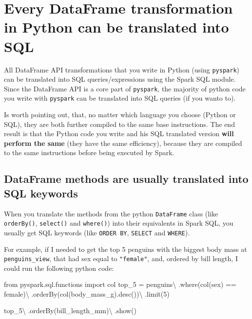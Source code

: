 \documentclass[
  11pt,
  letterpaper,
  DIV=11,
  numbers=noendperiod]{scrreprt}
\newenvironment{Shaded}{\begin{snugshade}}{\end{snugshade}}
\newcommand{\DecValTok}[1]{\textcolor[rgb]{0.68,0.00,0.00}{#1}}
\newcommand{\ImportTok}[1]{\textcolor[rgb]{0.00,0.46,0.62}{#1}}
\newcommand{\NormalTok}[1]{\textcolor[rgb]{0.00,0.23,0.31}{#1}}
\newcommand{\OperatorTok}[1]{\textcolor[rgb]{0.37,0.37,0.37}{#1}}
\newcommand{\StringTok}[1]{\textcolor[rgb]{0.13,0.47,0.30}{#1}}
\begin{document}
\section{Every DataFrame transformation in Python can be translated into
SQL}\label{every-dataframe-transformation-in-python-can-be-translated-into-sql}

All DataFrame API transformations that you write in Python (using
\texttt{pyspark}) can be translated into SQL queries/expressions using
the Spark SQL module. Since the DataFrame API is a core part of
\texttt{pyspark}, the majority of python code you write with
\texttt{pyspark} can be translated into SQL queries (if you wanto to).

Is worth pointing out, that, no matter which language you choose (Python
or SQL), they are both further compiled to the same base instructions.
The end result is that the Python code you write and his SQL translated
version \textbf{will perform the same} (they have the same efficiency),
because they are compiled to the same instructions before being executed
by Spark.

\subsection{DataFrame methods are usually translated into SQL
keywords}\label{dataframe-methods-are-usually-translated-into-sql-keywords}

When you translate the methods from the python \texttt{DataFrame} class
(like \texttt{orderBy()}, \texttt{select()} and \texttt{where()}) into
their equivalents in Spark SQL, you usually get SQL keywords (like
\texttt{ORDER\ BY}, \texttt{SELECT} and \texttt{WHERE}).

For example, if I needed to get the top 5 penguins with the biggest body
mass at \texttt{penguins\_view}, that had sex equal to
\texttt{"female"}, and, ordered by bill length, I could run the
following python code:

\begin{Shaded}
\begin{Highlighting}[]
\ImportTok{from}\NormalTok{ pyspark.sql.functions }\ImportTok{import}\NormalTok{ col}
\NormalTok{top\_5 }\OperatorTok{=}\NormalTok{ penguins}\OperatorTok{\textbackslash{}}
\NormalTok{    .where(col(}\StringTok{\textquotesingle{}sex\textquotesingle{}}\NormalTok{) }\OperatorTok{==} \StringTok{\textquotesingle{}female\textquotesingle{}}\NormalTok{)}\OperatorTok{\textbackslash{}}
\NormalTok{    .orderBy(col(}\StringTok{\textquotesingle{}body\_mass\_g\textquotesingle{}}\NormalTok{).desc())}\OperatorTok{\textbackslash{}}
\NormalTok{    .limit(}\DecValTok{5}\NormalTok{)}

\NormalTok{top\_5}\OperatorTok{\textbackslash{}}
\NormalTok{    .orderBy(}\StringTok{\textquotesingle{}bill\_length\_mm\textquotesingle{}}\NormalTok{)}\OperatorTok{\textbackslash{}}
\NormalTok{    .show()}
\end{Highlighting}
\end{Shaded}
\end{document}
